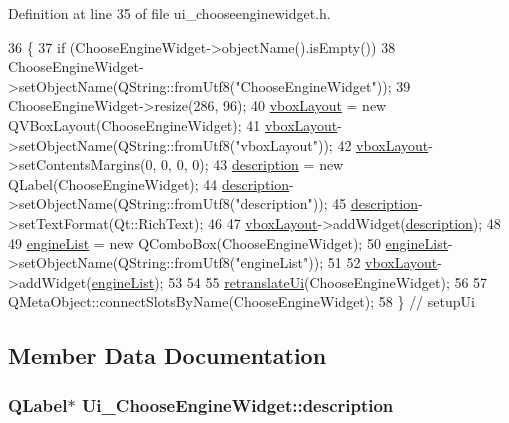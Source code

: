 Definition at line 35 of file ui\+\_\+chooseenginewidget.\+h.


\begin{DoxyCode}
36     \{
37         \textcolor{keywordflow}{if} (ChooseEngineWidget->objectName().isEmpty())
38             ChooseEngineWidget->setObjectName(QString::fromUtf8(\textcolor{stringliteral}{"ChooseEngineWidget"}));
39         ChooseEngineWidget->resize(286, 96);
40         \hyperlink{classUi__ChooseEngineWidget_abccfd24c2a3c6025b0099569dd4a4ab1}{vboxLayout} = \textcolor{keyword}{new} QVBoxLayout(ChooseEngineWidget);
41         \hyperlink{classUi__ChooseEngineWidget_abccfd24c2a3c6025b0099569dd4a4ab1}{vboxLayout}->setObjectName(QString::fromUtf8(\textcolor{stringliteral}{"vboxLayout"}));
42         \hyperlink{classUi__ChooseEngineWidget_abccfd24c2a3c6025b0099569dd4a4ab1}{vboxLayout}->setContentsMargins(0, 0, 0, 0);
43         \hyperlink{classUi__ChooseEngineWidget_aa5f94d071660758b15c9fafe3d143084}{description} = \textcolor{keyword}{new} QLabel(ChooseEngineWidget);
44         \hyperlink{classUi__ChooseEngineWidget_aa5f94d071660758b15c9fafe3d143084}{description}->setObjectName(QString::fromUtf8(\textcolor{stringliteral}{"description"}));
45         \hyperlink{classUi__ChooseEngineWidget_aa5f94d071660758b15c9fafe3d143084}{description}->setTextFormat(Qt::RichText);
46 
47         \hyperlink{classUi__ChooseEngineWidget_abccfd24c2a3c6025b0099569dd4a4ab1}{vboxLayout}->addWidget(\hyperlink{classUi__ChooseEngineWidget_aa5f94d071660758b15c9fafe3d143084}{description});
48 
49         \hyperlink{classUi__ChooseEngineWidget_aa7a6b768bf39b9a1f5e968edab33d00b}{engineList} = \textcolor{keyword}{new} QComboBox(ChooseEngineWidget);
50         \hyperlink{classUi__ChooseEngineWidget_aa7a6b768bf39b9a1f5e968edab33d00b}{engineList}->setObjectName(QString::fromUtf8(\textcolor{stringliteral}{"engineList"}));
51 
52         \hyperlink{classUi__ChooseEngineWidget_abccfd24c2a3c6025b0099569dd4a4ab1}{vboxLayout}->addWidget(\hyperlink{classUi__ChooseEngineWidget_aa7a6b768bf39b9a1f5e968edab33d00b}{engineList});
53 
54 
55         \hyperlink{classUi__ChooseEngineWidget_a636660d90f6dd75b0dc103df14a64322}{retranslateUi}(ChooseEngineWidget);
56 
57         QMetaObject::connectSlotsByName(ChooseEngineWidget);
58     \} \textcolor{comment}{// setupUi}
\end{DoxyCode}


\subsection{Member Data Documentation}
\hypertarget{classUi__ChooseEngineWidget_aa5f94d071660758b15c9fafe3d143084}{
\subsubsection[{description}]{\setlength{\rightskip}{0pt plus 5cm}Q\+Label$\ast$ Ui\+\_\+\+Choose\+Engine\+Widget\+::description}}\label{classUi__ChooseEngineWidget_aa5f94d071660758b15c9fafe3d143084}


